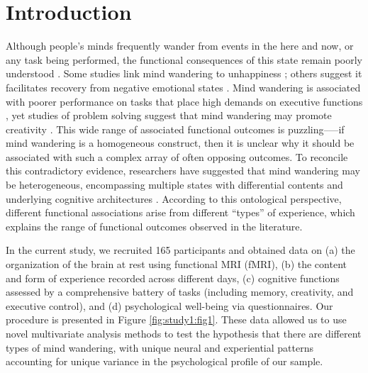 \section{Introduction}
\label{study1:intro}

Although people's minds frequently wander from events in the here and now, or any task being performed, the functional consequences of this state remain poorly understood \cite{Mittner2016,SeliTiCS2016,SmallwoodFrontiers2013}.
Some studies link mind wandering to unhappiness
\cite{Killingsworth2010}; 
others suggest it facilitates recovery from negative emotional states
\cite{Poerio2016,RubyPlos2013}.
Mind wandering is associated with poorer performance on tasks that place high demands on executive functions
\cite{McVay2009,MrazekJoEP2012},
yet studies of problem solving suggest that mind wandering may promote creativity 
\cite{Baird2012,Smeekens2016}.
This wide range of associated functional outcomes is puzzling--—if mind wandering is a homogeneous construct, then it is unclear why it should be associated with such a complex array of often opposing outcomes. To reconcile this contradictory evidence, researchers have suggested that mind wandering may be heterogeneous, encompassing multiple states with differential contents and underlying cognitive architectures \cite{SmallwoodFrontiers2013}. According to this ontological perspective, different functional associations arise from different “types” of experience, which explains the range of functional outcomes observed in the literature.

In the current study, we recruited 165 participants and obtained data on (a) the organization of the brain at rest using functional MRI (fMRI), (b) the content and form of experience recorded across different days, (c) cognitive functions assessed by a comprehensive battery of tasks (including memory, creativity, and executive control), and (d) psychological well-being via questionnaires. Our procedure is presented in Figure \ref{fig:study1:fig1}. These data allowed us to use novel multivariate analysis methods to test the hypothesis that there are different types of mind wandering, with unique neural and experiential patterns accounting for unique variance in the psychological profile of our sample.

